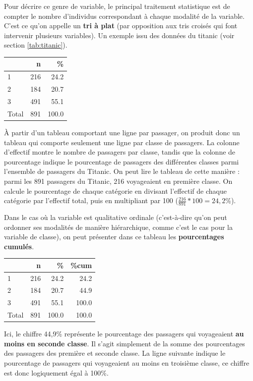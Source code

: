 \documentclass[
  french,
]{book}
\begin{document}
Pour décrire ce genre de variable, le principal traitement statistique est de compter le nombre d'individus correspondant à chaque modalité de la variable. C'est ce qu'on appelle un \textbf{tri à plat} (par opposition aux tris croisés qui font intervenir plusieurs variables). Un exemple issu des données du titanic (voir section \ref{tab:titanic}).

\begin{tabular}{l|r|r}
\hline
  & n & \%\\
\hline
1 & 216 & 24.2\\
\hline
2 & 184 & 20.7\\
\hline
3 & 491 & 55.1\\
\hline
Total & 891 & 100.0\\
\hline
\end{tabular}

À partir d'un tableau comportant une ligne par passager, on produit donc un tableau qui comporte seulement une ligne par classe de passagers. La colonne d'effectif montre le nombre de passagers par classe, tandis que la colonne de pourcentage indique le pourcentage de passagers des différentes classes parmi l'ensemble de passagers du Titanic. On peut lire le tableau de cette manière : parmi les 891 passagers du Titanic, 216 voyageaient en première classe. On calcule le pourcentage de chaque catégorie en divisant l'effectif de chaque catégorie par l'effectif total, puis en multipliant par 100 (\(\frac{216}{891}*100 = 24,2 \%\)).

Dans le cas où la variable est qualitative ordinale (c'est-à-dire qu'on peut ordonner ses modalités de manière hiérarchique, comme c'est le cas pour la variable de classe), on peut présenter dans ce tableau les \textbf{pourcentages cumulés}.

\begin{tabular}{l|r|r|r}
\hline
  & n & \% & \%cum\\
\hline
1 & 216 & 24.2 & 24.2\\
\hline
2 & 184 & 20.7 & 44.9\\
\hline
3 & 491 & 55.1 & 100.0\\
\hline
Total & 891 & 100.0 & 100.0\\
\hline
\end{tabular}

Ici, le chiffre 44,9\% représente le pourcentage des passagers qui voyageaient \textbf{au moins en seconde classe}. Il s'agit simplement de la somme des pourcentages des passagers des première et seconde classe. La ligne suivante indique le pourcentage de passagers qui voyageaient au moins en troisième classe, ce chiffre est donc logiquement égal à 100\%.
\end{document}
